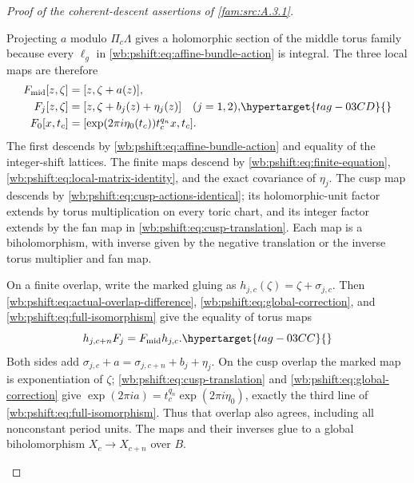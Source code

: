 \begin{proof}[Proof of the coherent-descent assertions of \cref{fam:src:A.3.1}]
\begin{enumerate}[label=\arabic*.,leftmargin=*]
Projecting $a$ modulo $\Pi_c\Lambda$ gives a holomorphic section of
the middle torus family because every $\ell_g$ in \eqref{wb:pshift:eq:affine-bundle-action} is integral.
The three local maps are therefore
\begin{equation}
\begin{aligned}
 F_{\mathrm{mid}}[z,\zeta]&=[z,\zeta+a(z)],\\
 F_j[z,\zeta]&=[z,\zeta+b_j(z)+\eta_j(z)]\quad(j=1,2),\\
 F_0[x,t_c]&=[\exp(2\pi i\eta_0(t_c))t_c^{q_n}x,t_c].
\end{aligned}
\hypertarget{tag-03CD}{}\label{wb:pshift:eq:full-isomorphism}
\end{equation}
The first descends by \eqref{wb:pshift:eq:affine-bundle-action} and equality of the integer-shift
lattices. The finite maps descend by \eqref{wb:pshift:eq:finite-equation}, \eqref{wb:pshift:eq:local-matrix-identity}, and the exact
covariance of $\eta_j$. The cusp map descends by \eqref{wb:pshift:eq:cusp-actions-identical}; its
holomorphic-unit factor extends by torus multiplication on every
toric chart, and its integer factor extends by the fan map in
\eqref{wb:pshift:eq:cusp-translation}. Each map is a biholomorphism, with inverse given by the
negative translation or the inverse torus multiplier and fan map.

On a finite overlap, write the marked gluing as
$h_{j,c}(\zeta)=\zeta+\sigma_{j,c}$. Then \eqref{wb:pshift:eq:actual-overlap-difference}, \eqref{wb:pshift:eq:global-correction}, and
\eqref{wb:pshift:eq:full-isomorphism} give the equality of torus maps
\begin{equation}
                     h_{j,c+n}F_j=F_{\mathrm{mid}}h_{j,c}.
 \hypertarget{tag-03CC}{}\label{wb:pshift:eq:finite-overlap-identity}
\end{equation}
Both sides add
$\sigma_{j,c}+a=\sigma_{j,c+n}+b_j+\eta_j$.
On the cusp overlap the marked map is exponentiation of $\zeta$;
\eqref{wb:pshift:eq:cusp-translation} and \eqref{wb:pshift:eq:global-correction} give
$\exp(2\pi ia)=t_c^{q_n}\exp(2\pi i\eta_0)$, exactly the
third line of \eqref{wb:pshift:eq:full-isomorphism}. Thus that overlap also agrees, including
all nonconstant period units. The maps and their inverses glue to
a global biholomorphism $X_c\to X_{c+n}$ over $B$.


\end{enumerate}
\end{proof}
